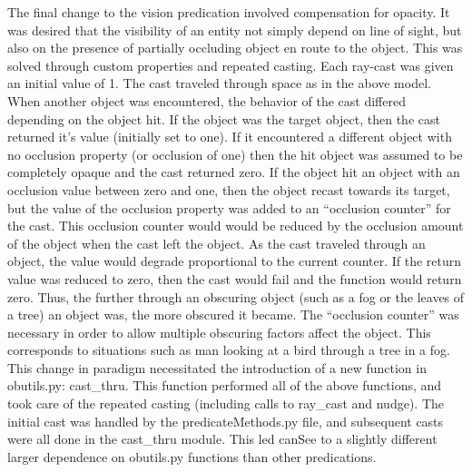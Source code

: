 The final change to the vision predication involved compensation for opacity. It was desired that the visibility of an entity not simply depend on line of sight, but also on the presence of partially occluding object en route to the object. This was solved through custom properties and repeated casting. Each ray-cast was given an initial value of 1. The cast traveled through space as in the above model. When another object was encountered, the behavior of the cast differed depending on the object hit. If the object was the target object, then the cast returned it's value (initially set to one). If it encountered a different object with no occlusion property (or occlusion of one) then the hit object was assumed to be completely opaque and the cast returned zero. If the object hit an object with an occlusion value between zero and one, then the object recast towards its target, but the value of the occlusion property was added to an “occlusion counter” for the cast. This occlusion counter would would be reduced by the occlusion amount of the object when the cast left the object.
As the cast traveled through an object, the value would degrade proportional to the current counter. If the return value was reduced to zero, then the cast would fail and the function would return zero. Thus, the further through an obscuring object (such as a fog or the leaves of a tree) an object was, the more obscured it became. The “occlusion counter” was necessary in order to allow multiple obscuring factors affect the object. This corresponds to situations such as man looking at a bird through a tree in a fog.
This change in paradigm necessitated the introduction of a new function in obutils.py: cast\_thru. This function performed all of the above functions, and took care of the repeated casting (including calls to ray\_cast and nudge). The initial cast was handled by the predicateMethods.py file, and subsequent casts were all done in the cast\_thru module. This led canSee to a slightly different larger dependence on obutils.py functions than other predications.

